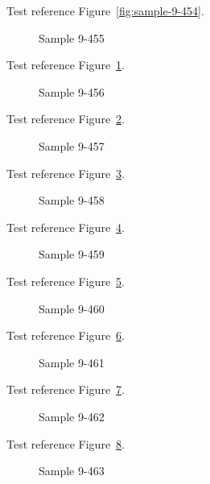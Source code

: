 Test reference Figure~\ref{fig:sample-9-454}.

\begin{figure}[tbhp]
\caption{Sample 9-455}
\label{fig:sample-9-455}
\end{figure}

Test reference Figure~\ref{fig:sample-9-455}.

\begin{figure}[tbhp]
\caption{Sample 9-456}
\label{fig:sample-9-456}
\end{figure}

Test reference Figure~\ref{fig:sample-9-456}.

\begin{figure}[tbhp]
\caption{Sample 9-457}
\label{fig:sample-9-457}
\end{figure}

Test reference Figure~\ref{fig:sample-9-457}.

\begin{figure}[tbhp]
\caption{Sample 9-458}
\label{fig:sample-9-458}
\end{figure}

Test reference Figure~\ref{fig:sample-9-458}.

\begin{figure}[tbhp]
\caption{Sample 9-459}
\label{fig:sample-9-459}
\end{figure}

Test reference Figure~\ref{fig:sample-9-459}.

\begin{figure}[tbhp]
\caption{Sample 9-460}
\label{fig:sample-9-460}
\end{figure}

Test reference Figure~\ref{fig:sample-9-460}.

\begin{figure}[tbhp]
\caption{Sample 9-461}
\label{fig:sample-9-461}
\end{figure}

Test reference Figure~\ref{fig:sample-9-461}.

\begin{figure}[tbhp]
\caption{Sample 9-462}
\label{fig:sample-9-462}
\end{figure}

Test reference Figure~\ref{fig:sample-9-462}.

\begin{figure}[tbhp]
\caption{Sample 9-463}
\label{fig:sample-9-463}
\end{figure}

